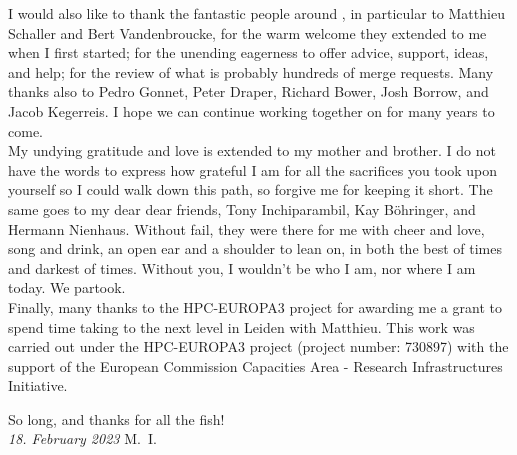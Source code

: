 I would also like to thank the fantastic people around \swift, in particular to Matthieu Schaller
and Bert Vandenbroucke, for the warm welcome they extended to me when I first started; for the
unending eagerness to offer advice, support, ideas, and help; for the review of what is probably
hundreds of merge requests. Many thanks also to Pedro Gonnet, Peter Draper, Richard Bower, Josh
Borrow, and Jacob Kegerreis. I hope we can continue working together on \swift for many years to
come. \\

My undying gratitude and love is extended to my mother and brother. I do not have the words to
express how grateful I am for all the sacrifices you took upon yourself so I could walk down this
path, so forgive me for keeping it short. The same goes to my dear dear friends, Tony Inchiparambil, Kay B\"ohringer, and Hermann Nienhaus. Without fail, they were there for me with cheer and love, song and drink, an open ear and a shoulder to lean on, in both the best of times and darkest of times. Without you, I wouldn't be who I am, nor where I am today. We partook. \\


Finally, many thanks to the HPC-EUROPA3 project for awarding me a grant to spend time taking
\GEARRT to the next level in Leiden with Matthieu. This work was carried out under the HPC-EUROPA3
project (project number: 730897) with the support of the European Commission Capacities Area -
Research Infrastructures Initiative.



\bigskip
\bigskip


So long, and thanks for all the fish! \\


\noindent\textit{18. February 2023}
\hfill M.~I.


